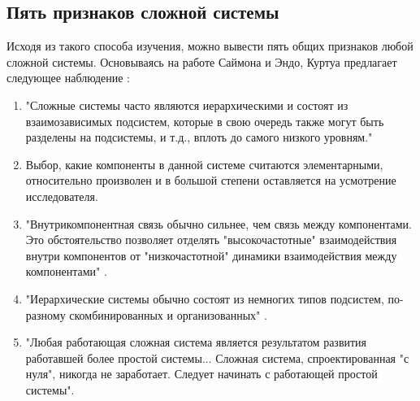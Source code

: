 \documentclass[11pt]{article}
\begin{document}
\subsection{Пять признаков сложной системы }
Исходя из такого способа изучения, можно вывести пять общих признаков любой сложной системы. Основываясь на работе Саймона и Эндо, Куртуа предлагает следующее наблюдение \cite[p.596]{7}:
\begin{enumerate}
    \item "Сложные системы часто являются иерархическими и состоят из взаимозависимых подсистем, которые в свою очередь также могут быть разделены на подсистемы, и т.д., вплоть до самого низкого уровням." 
    \item  Выбор, какие компоненты в данной системе считаются элементарными, относительно произволен и в большой степени оставляется на усмотрение исследователя.
    \item "Внутрикомпонентная связь обычно сильнее, чем связь между компонентами. Это обстоятельство позволяет отделять "высокочастотные" взаимодействия внутри компонентов от "низкочастотной" динамики взаимодействия между компонентами" \cite[p.217]{10}.
    \item "Иерархические системы обычно состоят из немногих типов подсистем, по-разному скомбинированных и организованных" \cite[p.221]{11}.
    \item "Любая работающая сложная система является результатом развития работавшей более простой системы... Сложная система, спроектированная "с нуля", никогда не заработает. Следует начинать с работающей простой системы". 
\end{enumerate}
\end{document}
